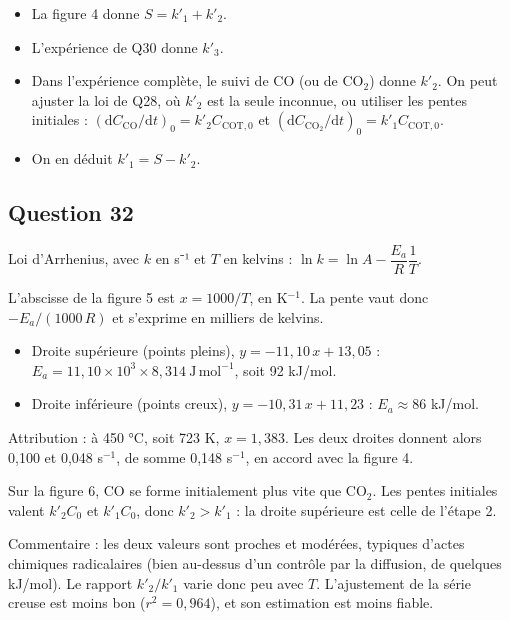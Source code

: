 \documentclass[11pt,a4paper]{article}
\providecommand{\tightlist}{\setlength{\itemsep}{0pt}\setlength{\parskip}{0pt}}
\newcommand{\equationajustee}[1]{%
  \sbox{\boiteequation}{$\displaystyle #1$}%
  \ifdim\wd\boiteequation>\linewidth
    \[\resizebox{\linewidth}{!}{\usebox{\boiteequation}}\]%
  \else
    \[#1\]%
  \fi}
\begin{document}
\begin{itemize}
\tightlist
\item
  La figure 4 donne \(S=k'_1+k'_2\).
\item
  L'expérience de Q30 donne \(k'_3\).
\item
  Dans l'expérience complète, le suivi de CO (ou de CO\(_2\)) donne \(k'_2\). On peut ajuster la loi de Q28, où \(k'_2\) est la seule inconnue, ou utiliser les pentes initiales : \((\mathrm{d}C_{\mathrm{CO}}/\mathrm{d}t)_0=k'_2C_{\mathrm{COT},0}\) et \((\mathrm{d}C_{\mathrm{CO_2}}/\mathrm{d}t)_0=k'_1C_{\mathrm{COT},0}\).
\item
  On en déduit \(k'_1=S-k'_2\).
\end{itemize}

\hypertarget{question-32}{%
\subsection{Question 32}\label{question-32}}

Loi d'Arrhenius, avec \(k\) en s⁻¹ et \(T\) en kelvins : \(\ln k=\ln A-\dfrac{E_a}{R}\dfrac1T\).

L'abscisse de la figure 5 est \(x=1000/T\), en K\(^{-1}\). La pente vaut donc \(-E_a/(1000\,R)\) et s'exprime en milliers de kelvins.

\begin{itemize}
\tightlist
\item
  Droite supérieure (points pleins), \(y=-11{,}10\,x+13{,}05\) : \(E_a=11{,}10\times10^3\times8{,}314\ \mathrm{J\,mol^{-1}}\), soit 92 kJ/mol.
\item
  Droite inférieure (points creux), \(y=-10{,}31\,x+11{,}23\) : \(E_a\approx86\) kJ/mol.
\end{itemize}

Attribution : à 450 °C, soit 723 K, \(x=1{,}383\). Les deux droites donnent alors 0,100 et 0,048 s\(^{-1}\), de somme 0,148 s\(^{-1}\), en accord avec la figure 4.

Sur la figure 6, CO se forme initialement plus vite que CO\(_2\). Les pentes initiales valent \(k'_2C_0\) et \(k'_1C_0\), donc \(k'_2>k'_1\) : la droite supérieure est celle de l'étape 2.

\equationajustee{\boxed{\begin{aligned}
E_{a2}&\approx92\ \mathrm{kJ\,mol^{-1}}\\
E_{a1}&\approx86\ \mathrm{kJ\,mol^{-1}}
\end{aligned}}}

Commentaire : les deux valeurs sont proches et modérées, typiques d'actes chimiques radicalaires (bien au-dessus d'un contrôle par la diffusion, de quelques kJ/mol). Le rapport \(k'_2/k'_1\) varie donc peu avec \(T\). L'ajustement de la série creuse est moins bon (\(r^2=0{,}964\)), et son estimation est moins fiable.
\end{document}
